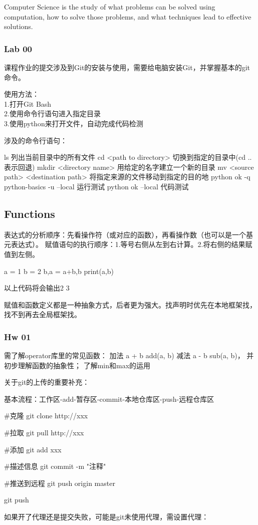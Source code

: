 \documentclass{ctexart}
\begin{document}
Computer Science is the study of 
what problems can be solved using computation,
how to solve those problems, and
what techniques lead to effective solutions.

\subsubsection{Lab 00}
课程作业的提交涉及到Git的安装与使用，需要给电脑安装Git，并掌握基本的git命令。

使用方法：\\1.打开Git Bash\\2.使用命令行语句进入指定目录\\
3.使用python来打开文件，自动完成代码检测

涉及的命令行语句：
\begin{python}
    ls 列出当前目录中的所有文件
    cd <path to directory> 切换到指定的目录中(cd .. 表示回退)
    mkdir <directory name> 用给定的名字建立一个新的目录
    mv <source path> <destination path> 将指定来源的文件移动到指定的目的地
    python ok -q python-basics -u --local 运行测试
    python ok --local 代码测试
\end{python}

\subsection{Functions}

表达式的分析顺序：先看操作符（或对应的函数），再看操作数（也可以是一个基元表达式）。
赋值语句的执行顺序：1.等号右侧从左到右计算。2.将右侧的结果赋值到左侧。

\begin{python}
    a = 1
    b = 2
    b,a = a+b,b
    print(a,b)
\end{python}
以上代码将会输出2 3

赋值和函数定义都是一种抽象方式，后者更为强大。找声明时优先在本地框架找，找不到再去全局框架找。

\subsubsection{Hw 01}

需了解operator库里的常见函数：
加法 a + b add(a, b)  减法 a - b sub(a, b)，
并初步理解函数的抽象性；
了解min和max的运用

关于git的上传的重要补充：

基本流程：工作区-add-暂存区-commit-本地仓库区-push-远程仓库区

\begin{python}
#克隆
git clone http://xxx

#拉取
git pull http://xxx

#添加
git add xxx

#描述信息
git commit -m "注释"

#推送到远程
git push origin master

git push
\end{python}
如果开了代理还是提交失败，可能是git未使用代理，需设置代理：
\end{document}
